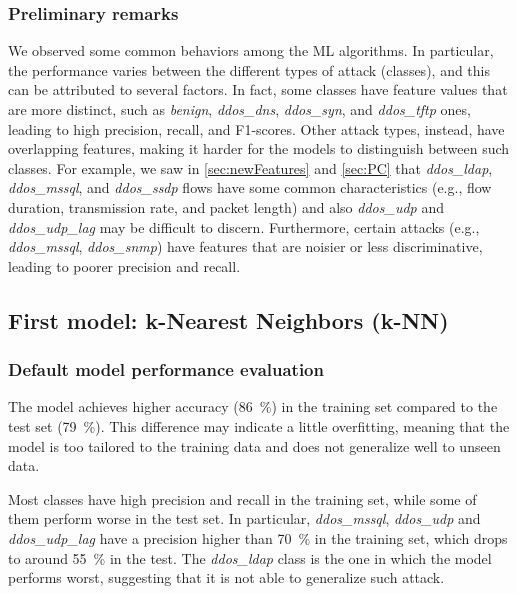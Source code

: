\documentclass[acmlarge,nonacm]{acmart}
\begin{document}
\subsubsection{Preliminary remarks}\label{sec:preliminaryRemarks}
We observed some common behaviors among the ML algorithms. In particular, the performance varies between the different types of attack (classes), and this can be attributed to several factors. In fact, some classes have feature values that are more distinct, such as \emph{benign}, \emph{ddos\_dns}, \emph{ddos\_syn}, and \emph{ddos\_tftp} ones, leading to high precision, recall, and F1-scores. Other attack types, instead, have overlapping features, making it harder for the models to distinguish between such classes. For example, we saw in \cref{sec:newFeatures} and \cref{sec:PC} that \emph{ddos\_ldap},  \emph{ddos\_mssql}, and \emph{ddos\_ssdp} flows have some common characteristics (e.g., flow duration, transmission rate, and packet length) and also \emph{ddos\_udp} and \emph{ddos\_udp\_lag} may be difficult to discern. Furthermore, certain attacks (e.g., \emph{ddos\_mssql}, \emph{ddos\_snmp}) have features that are noisier or less discriminative, leading to poorer precision and recall.

\subsection{First model: k-Nearest Neighbors (k-NN)}
\subsubsection{Default model performance evaluation} 
The model achieves higher accuracy (\SI{86}{\percent}) in the training set compared to the test set (\SI{79}{\percent}). This difference may indicate a little overfitting, meaning that the model is too tailored to the training data and does not generalize well to unseen data. 

Most classes have high precision and recall in the training set, while some of them perform worse in the test set. In particular, \emph{ddos\_mssql}, \emph{ddos\_udp} and \emph{ddos\_udp\_lag} have a precision higher than \SI{70}{\percent} in the training set, which drops to around \SI{55}{\percent} in the test. The \emph{ddos\_ldap} class is the one in which the model performs worst, suggesting that it is not able to generalize such attack.
\end{document}
